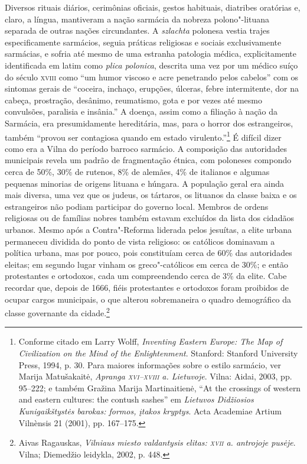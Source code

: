 Diversos rituais diários, cerimônias oficiais, gestos habituais,
diatribes oratórias e, claro, a língua, mantiveram a nação sarmácia da
nobreza polono"-lituana separada de outras nações circundantes. A
\textit{szlachta} polonesa vestia trajes especificamente sarmácios, seguia
práticas religiosas e sociais exclusivamente sarmácias, e sofria até
mesmo de uma estranha patologia médica, explicitamente identificada em
latim como \textit{plica polonica}, descrita uma vez por um médico suíço
do século \textsc{xviii} como ``um humor viscoso e acre penetrando pelos cabelos''
com os sintomas gerais de ``coceira, inchaço, erupções, úlceras, febre
intermitente, dor na cabeça, prostração, desânimo, reumatismo, gota e
por vezes até mesmo convulsões, paralisia e insânia.'' A doença, assim
como a filiação à nação da Sarmácia, era presumidamente hereditária,
mas, para o horror dos estrangeiros, também ``provou ser contagiosa
quando em estado virulento.''\footnote{Conforme citado em Larry Wolff, \textit{Inventing Eastern Europe: The Map of Civilization on the Mind of the Enlightenment}. Stanford: Stanford University Press, 1994, p. 30. Para maiores informações sobre o estilo sarmácio, ver Marija Matušakaitė, \textit{Apranga \textsc{xvi}--\textsc{xviii} a. Lietuvoje}. Vilna: Aidai, 2003, pp. 95--222; e também Gražina Marija Martinaitienė, ``At the crossings of western and eastern cultures: the contush sashes'' em \textit{Lietuvos Didžiosios Kunigaikštystės barokas: formos, įtakos kryptys}. Acta Academiae Artium Vilnènsis 21 (2001), pp. 167--175.}
É difícil dizer como era a Vilna do período barroco sarmácio. A
composição das autoridades municipais revela um padrão de fragmentação
étnica, com poloneses compondo cerca de 50\%, 30\% de rutenos, 8\% de alemães, 4\% de
italianos e algumas pequenas minorias de origens lituana e húngara. A
população geral era ainda mais diversa, uma vez que os judeus, os
tártaros, os lituanos da classe baixa e os estrangeiros não podiam
participar do governo local. Membros de ordens religiosas ou de famílias
nobres também estavam excluídos da lista dos cidadãos urbanos. Mesmo
após a Contra"-Reforma liderada pelos jesuítas, a elite urbana permaneceu
dividida do ponto de vista religioso: os católicos dominavam a política
urbana, mas por pouco, pois constituíam cerca de 60\% das
autoridades eleitas; em segundo lugar vinham os greco"-católicos em cerca
de 30\%; e então protestantes e ortodoxos, cada um
compreendendo cerca de 3\% da elite. Cabe recordar que,
depois de 1666, fiéis protestantes e ortodoxos foram proibidos de ocupar
cargos municipais, o que alterou sobremaneira o quadro demográfico da
classe governante da cidade.\footnote{Aivas Ragauskas, \textit{Vilniaus miesto valdantysis elitas: \textsc{xvii} a. antrojoje pusėje}. Vilna; Diemedžio leidykla, 2002, p. 448.}


